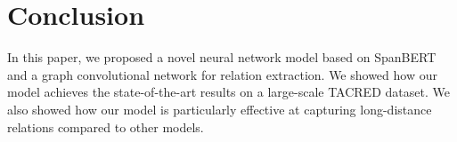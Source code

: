 \documentclass{article}
\begin{document}
		 

		 
		 


    


\section{Conclusion}
In this paper, we proposed a novel neural network model based on SpanBERT and a graph convolutional network for relation extraction. We showed how our model achieves the state-of-the-art results on a large-scale TACRED dataset. We also showed how our model is particularly effective at capturing long-distance relations compared to other models.

  
  
\end{document}
